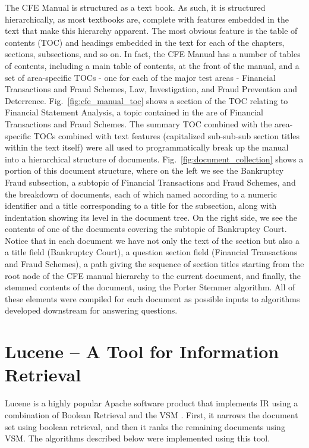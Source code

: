The CFE Manual is structured as a text book. As such, it is structured hierarchically, as most textbooks are, complete with features embedded in the text that make this hierarchy apparent.  The most obvious feature is the table of contents (TOC) and headings embedded in the text for each of the chapters, sections, subsections, and so on.  In fact, the CFE Manual has a number of tables of contents, including a main table of contents, at the front of the manual, and a set of area-specific TOCs - one for each of the major test areas - Financial Transactions and Fraud Schemes, Law, Investigation, and Fraud Prevention and Deterrence.  Fig.~\ref{fig:cfe_manual_toc} shows a section of the TOC relating to Financial Statement Analysis, a topic contained in the are of Financial Transactions and Fraud Schemes.  The summary TOC combined with the area-specific TOCs combined with text features (capitalized sub-sub-sub section titles within the text itself) were all used to programmatically break up the manual into a hierarchical structure of documents.  Fig.~\ref{fig:document_collection} shows a portion of this document structure, where on the left we see the Bankruptcy Fraud subsection, a subtopic of Financial Transactions and Fraud Schemes, and the breakdown of documents, each of which named according to a numeric identifier and a title corresponding to a title for the subsection, along with indentation showing its level in the document tree.  On the right side, we see the contents of one of the documents covering the subtopic of Bankruptcy Court.  Notice that in each document we have not only the text of the section but also a a title field (Bankruptcy Court), a question section field (Financial Transactions and Fraud Schemes), a path giving the sequence of section titles starting from the root node of the CFE manual hierarchy to the current document, and finally, the stemmed contents of the document, using the Porter Stemmer algorithm.  All of these elements were compiled for each document as possible inputs to algorithms developed downstream for answering questions.  

\section{Lucene -- A Tool for Information Retrieval}

Lucene \cite{lucene} is a highly popular Apache software product that implements IR using a combination of Boolean Retrieval and the VSM \cite{McCandless:2010:LAS:1893016_ch1,McCandless:2010:LAS:1893016_ch2,McCandless:2010:LAS:1893016_ch3,McCandless:2010:LAS:1893016_ch4}.  First, it narrows the document set using boolean retrieval, and then it ranks the remaining documents using VSM.  The algorithms described below were implemented using this tool.  

